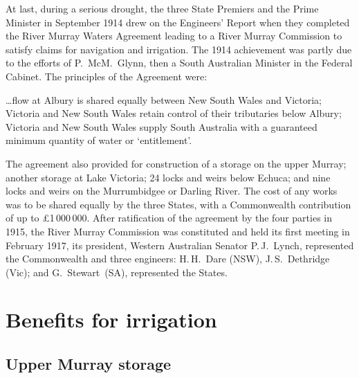 At last, during a serious drought, the three State Premiers and the
Prime Minister in September 1914 drew on the Engineers' Report when
they completed the River Murray Waters Agreement leading to a River
Murray Commission  to satisfy claims
for navigation and irrigation. The 1914 achievement was partly due to
the efforts of P.~McM.~Glynn,  then a South
Australian Minister in the Federal Cabinet. The principles of the Agreement were:
\begin{Quote}
	\ldots flow at Albury  is shared equally
	between New South Wales and Victoria; Victoria and New South
	Wales retain control of their tributaries below Albury;
	Victoria and New South Wales supply South Australia with a
	guaranteed minimum quantity of water or
	`entitlement'.
\end{Quote}

The agreement also provided for construction of a storage on the upper
Murray; another storage at Lake Victoria;  24
locks and weirs  below Echuca;  and
nine locks and weirs on the Murrumbidgee or Darling
River.   The cost of
any works was to be shared equally by the three States, with a
Commonwealth contribution of up to \pounds1\,000\,000. After
ratification of the agreement by the four parties in 1915, the River
Murray Commission was constituted and held its first meeting in
February 1917, its president, Western Australian Senator P.\,J.~Lynch,
  represented the Commonwealth and three
engineers: H.\,H.~Dare (NSW),   J.\,S.~Dethridge
(Vic);  and G.~Stewart~(SA),   represented the States.

\section*{Benefits for irrigation}

\subsection*{Upper Murray storage}

